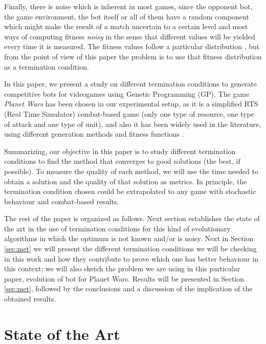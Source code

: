 \documentclass[runningheads,a4paper]{llncs}
\begin{document}
Finally, there is noise which is inherent in most games, since the
opponent bot, the game environment, the bot itself or all of them have
a random component which might make the result of a match uncertain to
a certain level and most ways of computing fitness {\em noisy} in the
sense that different values will be yielded every time it is
measured. The fitness values follow a particular distribution
\cite{merelo14:noisy}, but from the point of view of this paper the
problem is to use that fitness distribution as a termination
condition. 


In this paper, we present a study on different termination conditions to 
generate competitive bots for videogames using Genetic Programming (GP). The game \textit{Planet Wars} has been chosen in 
our experimental setup, as it is a simplified RTS (Real Time Simulator) combat-based
game (only one type of resource, one type of attack and one type
of unit), and also it has been widely used in the literature, using different generation methods and fitness functions 
\cite{DBLP:journals/jcst/MoraFGGF12,DBLP:conf/cec/Fernandez-AresMGGF11,DBLP:journals/nc/Lara-CabreraCL14,NogueiraCoevolutionary14}. 

Summarizing, our objective in this paper is to study different 
termination conditions to find the method that converges to good 
solutions (the best, if possible). To measure the quality of each 
method, we will use the time needed to obtain a solution and the
quality of that solution as metrics. In principle, the termination
condition chosen could be extrapolated to any game with
stochastic behaviour and combat-based results.

The rest of the paper is organized as follows. Next section
establishes the state of the art in the use of termination conditions
for this kind of evolutionary algorithms in which the optimum is not
known and/or is noisy. Next in Section \ref{sec:met} we will present the different termination
conditions we will be checking in this work and how they contribute to
prove which one has better behaviour in this context; we will also
sketch the problem we are using in this particular paper, evolution of
bot for Planet Wars. Results will be presented in Section
\ref{sec:met}, followed by the conclusions and a discussion of the
implication of the obtained results.

\section{State of the Art}
\end{document}
